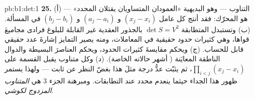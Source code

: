 \begin{solution}{pb:b1:det:1}
\textbf{25.} (أ) التناوب --- وهو البديهية «العمودان المتساويان
يقتلان المحدد» --- هو المحرّك: فقد أنتج كل
عامل $(x_j - x_i)$ و $(a_j - a_i)$ و $(b_j - b_i)$ في
المسألة. (ب) وتستبدل المتطابقة $\det S = V^2$
بالجذور العقدية غير القابلة للبلوغ فرادى مجاميعَ قواها،
وهي كثيرات حدود حقيقية في المعاملات، ومنه يصير التمايز
إشارةَ عدد حقيقي قابل للحساب. (ج) ويحكم  مقايسةَ كثيرات الحدود، ويحكم  العناصرَ البسيطة والدوال الناطقة المعايَنة
( أشهر
حالاته الخاصة). (د) وكل  متناوب يقبل القسمة على
$\prod_{i<j}(x_j - x_i)$، ثم يثبّت عدُّ درجة مثلَ هذا
 بغضّ النظر عن ثابت --- ولهذا يستمر ظهور هذا الجداء
حيثما ينعدم محدد عند
التطابقات. ومبرهنة الجزء 3 هي \emph{المتناوب المزدوج
لكوشي}.
\end{solution}
